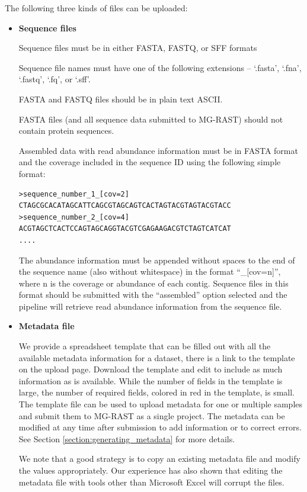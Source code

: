 \documentclass[12pt,fullpage]{report}
\begin{document}
The following three kinds of files can be uploaded:

\begin{itemize}
\item {\bf Sequence files}

Sequence files must be in either FASTA, FASTQ, or SFF formats

Sequence file names must have one of the following extensions -- `.fasta', `.fna', `.fastq', `.fq', or `.sff'.

FASTA and FASTQ files should be in plain text ASCII.

FASTA files (and all sequence data submitted to MG-RAST) should not contain protein sequences.

Assembled data with read abundance information must be in FASTA format and the coverage included in the sequence ID using the following simple format:
\begin{verbatim}
>sequence_number_1_[cov=2]
CTAGCGCACATAGCATTCAGCGTAGCAGTCACTAGTACGTAGTACGTACC
>sequence_number_2_[cov=4]
ACGTAGCTCACTCCAGTAGCAGGTACGTCGAGAAGACGTCTAGTCATCAT
....
\end{verbatim}

The abundance information must be appended without spaces to the end of the sequence name (also without whitespace) in the format ``\_[cov=n]'', where n is the coverage or abundance of each contig.
Sequence files in this format should be submitted with the ``assembled'' option selected and the pipeline will retrieve read abundance information from the sequence file.

\item {\bf Metadata file}

We provide a spreadsheet template that can be filled out with all the available metadata information for a dataset, there is a link to the template on the upload page. Download the template and edit to include as much information as is available. While the number of fields in the template is large, the number of required fields, colored in red in the template, is small. The template file can be used to upload metadata for one or multiple samples and submit them to MG-RAST as a single project. The metadata can be modified at any time after submission to add information or to correct errors. See Section \ref{section:generating_metadata} for more details.

We note that a good strategy is to copy an existing metadata file and modify the values appropriately. Our experience has also shown that editing the metadata file with tools other than Microsoft Excel will corrupt the files.



\end{itemize}
\end{document}
